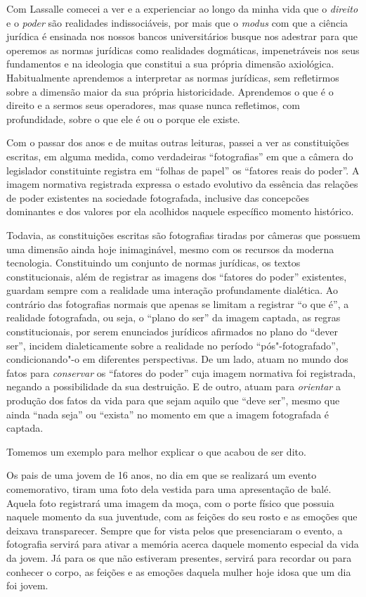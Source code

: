 Com Lassalle comecei a ver e a experienciar ao longo da minha vida que o
\emph{direito} e o \emph{poder} são realidades indissociáveis, por mais
que o \emph{modus} com que a ciência jurídica é ensinada nos nossos
bancos universitários busque nos adestrar para que operemos as normas
jurídicas como realidades dogmáticas, impenetráveis nos seus fundamentos
e na ideologia que constitui a sua própria dimensão axiológica.
Habitualmente aprendemos a interpretar as normas jurídicas, sem
refletirmos sobre a dimensão maior da sua própria historicidade.
Aprendemos o que é o direito e a sermos seus operadores, mas quase nunca
refletimos, com profundidade, sobre o que ele é ou o porque ele existe.

Com o passar dos anos e de muitas outras leituras, passei a ver as
constituições escritas, em alguma medida, como verdadeiras
``fotografias'' em que a câmera do legislador constituinte
registra em ``folhas de papel'' os ``fatores reais do
poder''. A imagem normativa registrada expressa o estado evolutivo da
essência das relações de poder existentes na sociedade fotografada,
inclusive das concepcões dominantes e dos valores por ela acolhidos
naquele específico momento histórico.

Todavia, as constituições escritas são fotografias tiradas por câmeras
que possuem uma dimensão ainda hoje inimaginável, mesmo com os recursos
da moderna tecnologia. Constituindo um conjunto de normas jurídicas, os
textos constitucionais, além de registrar as imagens dos ``fatores
do poder'' existentes, guardam sempre com a realidade uma interação
profundamente dialética. Ao contrário das fotografias normais que apenas
se limitam a registrar ``o que é'', a realidade fotografada, ou
seja, o ``plano do ser'' da imagem captada, as regras
constitucionais, por serem enunciados jurídicos afirmados no plano do
``dever ser'', incidem dialeticamente sobre a realidade no
período ``pós"-fotografado'', condicionando"-o em diferentes perspectivas.
De um lado, atuam no mundo dos fatos para \emph{conservar} os
``fatores do poder'' cuja imagem normativa foi registrada,
negando a possibilidade da sua destruição. E de outro, atuam para
\emph{orientar} a produção dos fatos da vida para que sejam
aquilo que ``deve ser'', mesmo que ainda ``nada seja'' ou
``exista'' no momento em que a imagem fotografada é captada.

Tomemos um exemplo para melhor explicar o que acabou de ser dito.

Os pais de uma jovem de 16 anos, no dia em que se realizará um evento
comemorativo, tiram uma foto dela vestida para uma apresentação de
balé. Aquela foto registrará uma imagem da moça, com o porte
físico que possuia naquele momento da sua juventude, com as feições do
seu rosto e as emoções que deixava transparecer. Sempre que for vista
pelos que presenciaram o evento, a fotografia servirá para ativar a
memória acerca daquele momento especial da vida da jovem. Já para os que
não estiveram presentes, servirá para recordar ou para conhecer o corpo,
as feições e as emoções daquela mulher hoje idosa que um dia foi jovem.

